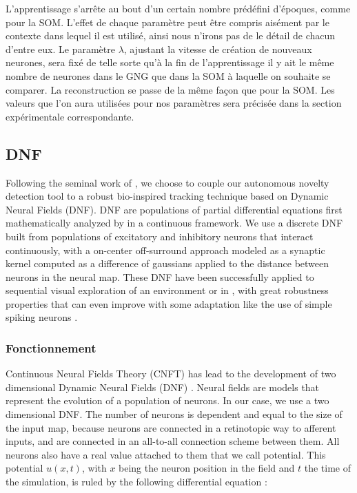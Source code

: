 	L'apprentissage s'arrête au bout d'un certain nombre prédéfini d'époques, comme pour la SOM. L'effet de chaque paramètre peut être compris aisément par le contexte dans lequel il est utilisé, ainsi nous n'irons pas de le détail de chacun d'entre eux. Le paramètre $\lambda$, ajustant la vitesse de création de nouveaux neurones, sera fixé de telle sorte qu'à la fin de l'apprentissage il y ait le même nombre de neurones dans le GNG que dans la SOM à laquelle on souhaite se comparer. La reconstruction se passe de la même façon que pour la SOM. Les valeurs que l'on aura utilisées pour nos paramètres sera précisée dans la section expérimentale correspondante.

	\subsection{DNF}\label{sec:sota:dnf}
	

	Following the seminal work of \cite{Fix:dnf:2011}, we choose to couple our autonomous novelty detection tool to a robust bio-inspired tracking technique based on Dynamic Neural Fields (DNF). DNF are populations of partial differential equations first mathematically analyzed by \cite{amari:dnf:1977} in a continuous framework. We use a discrete DNF built from populations of excitatory and inhibitory neurons that interact continuously, with a on-center off-surround approach modeled as a synaptic kernel computed as a difference of gaussians applied to the distance between neurons in the neural map. These DNF have been successfully applied to sequential visual exploration of an environment \cite{Fix:dnf:2011} or in \cite{rougier:attention:2005}, with great robustness properties that can even improve with some adaptation like the use of simple spiking neurons \cite{vazquez:dnf:2011}. 

	\subsubsection{Fonctionnement}

	Continuous Neural Fields Theory (CNFT) has lead to the development of two dimensional Dynamic Neural Fields (DNF) \cite{Taylor2D}. Neural fields are models that represent the evolution of a population of neurons. In our case, we use a two dimensional DNF. The number of neurons is dependent and equal to the size of the input map, because neurons are connected in a retinotopic way to afferent inputs, and are connected in an all-to-all connection scheme between them. All neurons also have a real value attached to them that we call potential. This potential $u(x,t)$, with $x$ being the neuron position in the field and $t$ the time of the simulation, is ruled by the following differential equation :


